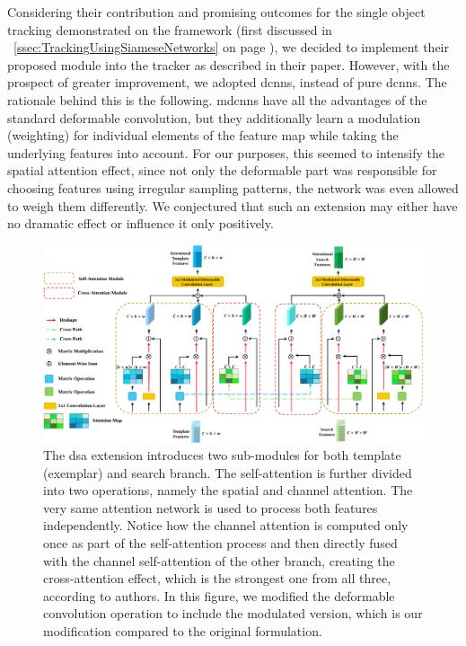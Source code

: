Considering their contribution and promising outcomes for the single object tracking demonstrated on the \siamrpn{} framework (first discussed in \sectiontext{}~\ref{ssec:TrackingUsingSiameseNetworks} on page \pageref{ssec:TrackingUsingSiameseNetworks}), we decided to implement their proposed module into the \siammot{} tracker as described in their paper. However, with the prospect of greater improvement, we adopted \glspl{dcnn}, instead of pure \glspl{dcnn}. The rationale behind this is the following. \Glspl{mdcnn} have all the advantages of the standard deformable convolution, but they additionally learn a modulation (weighting) for individual elements of the feature map while taking the underlying features into account. For our purposes, this seemed to intensify the spatial attention effect, since not only the deformable part was responsible for choosing features using irregular sampling patterns, the network was even allowed to weigh them differently. We conjectured that such an extension may either have no dramatic effect or influence it only positively.

\begin{figure}[t]
    \centerline{\includegraphics[width=\linewidth]{figures/siamese_tracking/deformable_siamese_attention.pdf}}
    \caption[\Gls{dsa} diagram]{The \gls{dsa} extension introduces two sub-modules for both template (exemplar) and search branch. The self-attention is further divided into two operations, namely the spatial and channel attention. The very same attention network is used to process both features independently. Notice how the channel attention is computed only once as part of the self-attention process and then directly fused with the channel self-attention of the other branch, creating the cross-attention effect, which is the strongest one from all three, according to authors. In this figure, we modified the deformable convolution operation to include the modulated version, which is our modification compared to the original formulation. }
    \label{fig:DeformableSiameseAttention}
\end{figure}

